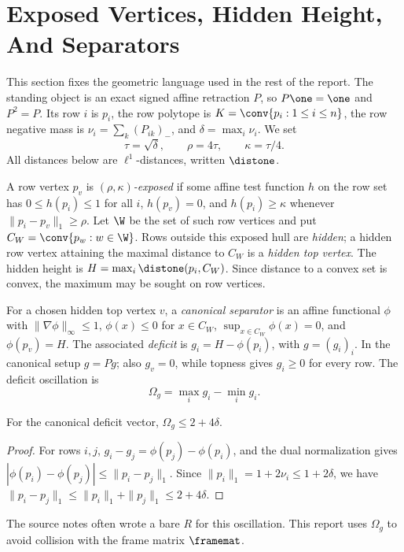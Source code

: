 \section{Exposed Vertices, Hidden Height, And Separators}
\label{sec:geometry-exposedness}

This section fixes the geometric language used in the rest of the report.
The standing object is an exact signed affine retraction \(P\), so
\(P\one=\one\) and \(P^2=P\).  Its row \(i\) is \(p_i\), the row polytope
is \(K=\conv\{p_i:1\le i\le n\}\), the row negative mass is
\(\nu_i=\sum_k(P_{ik})_-\), and \(\delta=\max_i\nu_i\).  We set
\[
        \tau=\sqrt{\delta},\qquad \rho=4\tau,\qquad \kappa=\tau/4 .
\]
All distances below are \(\ell^1\)-distances, written \(\distone\).

A row vertex \(p_v\) is \emph{\((\rho,\kappa)\)-exposed} if some affine
test function \(h\) on the row set has \(0\le h(p_i)\le1\) for all \(i\),
\(h(p_v)=0\), and \(h(p_i)\ge\kappa\) whenever
\(\|p_i-p_v\|_1\ge\rho\).  Let \(\W\) be the set of such row vertices and
put \(C_W=\conv\{p_w:w\in\W\}\).  Rows outside this exposed hull are
\emph{hidden}; a hidden row vertex attaining the maximal distance to
\(C_W\) is a \emph{hidden top vertex}.  The hidden height is
\(H=\max_i\distone(p_i,C_W)\).  Since distance to a convex set is convex,
the maximum may be sought on row vertices.

For a chosen hidden top vertex \(v\), a \emph{canonical separator} is an
affine functional \(\phi\) with \(\|\nabla\phi\|_\infty\le1\),
\(\phi(x)\le0\) for \(x\in C_W\), \(\sup_{x\in C_W}\phi(x)=0\), and
\(\phi(p_v)=H\).  The associated \emph{deficit} is
\(g_i=H-\phi(p_i)\), with \(g=(g_i)_i\).  In the canonical setup
\(g=Pg\); also \(g_v=0\), while topness gives \(g_i\ge0\) for every
row.  The deficit oscillation is
\[
        \Omega_g=\max_i g_i-\min_i g_i .
\]
\begin{lemma}
\provedbadge\label{lem:omega-g-bound}
For the canonical deficit vector, \(\Omega_g\le 2+4\delta\).
\end{lemma}

\begin{proof}
For rows \(i,j\), \(g_i-g_j=\phi(p_j)-\phi(p_i)\), and the dual
normalization gives \(|\phi(p_i)-\phi(p_j)|\le\|p_i-p_j\|_1\).  Since
\(\|p_i\|_1=1+2\nu_i\le1+2\delta\), we have
\(\|p_i-p_j\|_1\le\|p_i\|_1+\|p_j\|_1\le2+4\delta\).
\end{proof}
The source notes often wrote a bare \(R\) for this oscillation.  This
report uses \(\Omega_g\) to avoid collision with the frame matrix
\(\framemat\).

